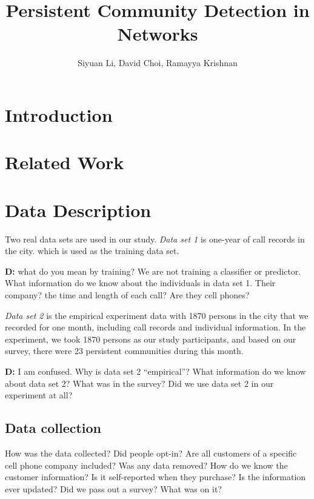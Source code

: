 \documentclass{article}
\begin{document}
\title{Persistent Community Detection in Networks}
\author{Siyuan Li, David Choi, Ramayya Krishnan}

\maketitle


\begin{abstract}

\end{abstract}

\section{Introduction}

\section{Related Work}

\section{Data Description}

Two real data sets are used in our study. \textit{Data set 1} is one-year of call records in the city. which is used as the
training data set. 

\textbf{D:} what do you mean by training? We are not training a classifier or predictor. What information do we know about the individuals in data set 1. Their company? the time and length of each call? Are they cell phones? 

\textit{Data set 2} is the empirical experiment data with 1870 persons
in the city that we recorded for one month, including call records and individual information. In the experiment, we
took 1870 persons as our study participants, and based on our survey, there were 23 persistent communities during this month.

\textbf{D:} I am confused. Why is data set 2 ``empirical''? What information do we know about data set 2? What was in the survey? Did we use data set 2 in our experiment at all?


\subsection{Data collection}

How was the data collected? Did people opt-in? Are all customers of a specific cell phone company included? Was any data removed? How do we know the customer information? Is it self-reported when they purchase? Is the information ever updated? Did we pass out a survey? What was on it?
\end{document}
